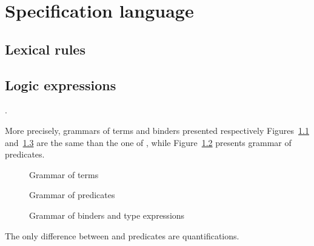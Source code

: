 
\chapter{Specification language}
\label{chap:base}


\section{Lexical rules}
\nodiff


\section{Logic expressions}
\label{sec:expressions}

.

More precisely, grammars of terms and binders presented respectively
Figures~\ref{fig:gram:term} and~\ref{fig:gram:binders} are the same than the one
of \acsl, while Figure~\ref{fig:gram:pred} presents grammar of predicates.
\begin{figure}[htbp]
  \begin{cadre}
    
  \end{cadre}
  \caption{Grammar of terms}
\label{fig:gram:term}
\end{figure}
\begin{figure}[htbp]
  \begin{cadre}
    
  \end{cadre}
  \caption{Grammar of predicates}
\label{fig:gram:pred}
\end{figure}
\begin{figure}[htbp]
  \caption{Grammar of binders and type expressions}
\label{fig:gram:binders}
\end{figure}
The only difference between \eacsl and \acsl predicates are
quantifications.

